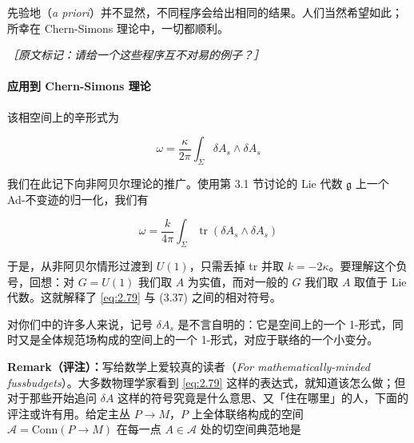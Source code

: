 先验地（\emph{a priori}）并不显然，不同程序会给出相同的结果。人们当然希望如此；所幸在 Chern-Simons 理论中，一切都顺利。

{\small\itshape ［原文标记：请给一个这些程序互不对易的例子？］}%

\paragraph{应用到 Chern-Simons 理论} %

该相空间上的辛形式为

\begin{equation}
  \omega=\frac{\kappa}{2\pi}\int_{\Sigma}\delta A_s\wedge\delta A_s
  \tag{2.79}
  \label{eq:2.79}
\end{equation}

我们在此记下向非阿贝尔理论的推广。使用第 3.1 节讨论的 Lie 代数 $\mathfrak{g}$ 上一个 Ad-不变迹的归一化，我们有

\begin{equation}
  \omega=\frac{k}{4\pi}\int_{\Sigma}\operatorname{tr}\left(\delta A_s\wedge\delta A_s\right)
  \tag{2.80}
  \label{eq:2.80}
\end{equation}

于是，从非阿贝尔情形过渡到 $U(1)$，只需丢掉 tr 并取 $k=-2\kappa$。要理解这个负号，回想：对 $G=U(1)$ 我们取 $A$ 为实值，而对一般的 $G$ 我们取 $A$ 取值于 Lie 代数。这就解释了 \eqref{eq:2.79} 与 (3.37) 之间的相对符号。

对你们中的许多人来说，记号 $\delta A_s$ 是不言自明的：它是空间上的一个 1-形式，同时又是全体规范场构成的空间上的一个 1-形式，对应于联络的一个小变分。


\textbf{Remark（评注）：}写给数学上爱较真的读者（\emph{For mathematically-minded fussbudgets}）。大多数物理学家看到 \eqref{eq:2.79} 这样的表达式，就知道该怎么做；但对于那些开始追问 $\delta A$ 这样的符号究竟是什么意思、又「住在哪里」的人，下面的评注或许有用。给定主丛 $P\to M$，$P$ 上全体联络构成的空间 $\mathcal{A}=\mathrm{Conn}(P\to M)$ 在每一点 $A\in\mathcal{A}$ 处的切空间典范地是


